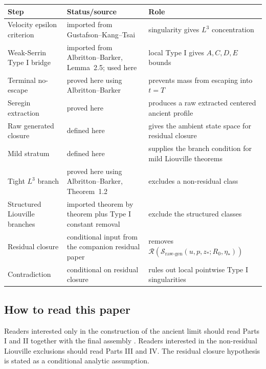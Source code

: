 \documentclass[11pt]{amsart}
\theoremstyle{plain}
\theoremstyle{definition}
\theoremstyle{remark}
\numberwithin{equation}{section}
\newcommand{\calS}{\mathcal S}
\newcommand{\calR}{\mathcal R}
\begin{document}
\begin{center}
\small
\setlength{\tabcolsep}{4pt}
\begin{tabular}{@{}>{\raggedright\arraybackslash}p{}
                >{\raggedright\arraybackslash}p{}
                >{\raggedright\arraybackslash}p{}@{}}
\hline
Step & Status/source & Role \\
\hline
Velocity epsilon criterion & imported from Gustafson--Kang--Tsai & singularity gives \(L^3\) concentration \\
Weak-Serrin Type I bridge & imported from Albritton--Barker, Lemma~2.5; used here & local Type I gives \(A,C,D,E\) bounds \\
Terminal no-escape & proved here using Albritton--Barker & prevents mass from escaping into \(t=T\) \\
Seregin extraction & proved here & produces a raw extracted centered ancient profile \\
Raw generated closure & defined here & gives the ambient state space for residual closure \\
Mild stratum & defined here & supplies the branch condition for mild Liouville theorems \\
Tight \(L^3\) branch & proved here using Albritton--Barker, Theorem~1.2 & excludes a non-residual class \\
Structured Liouville branches & imported theorem by theorem plus Type I constant removal & exclude the structured classes \\
Residual closure & conditional input from the companion residual paper & removes \(\calR(\calS_{\mathrm{raw\text{-}gen}}(u,p,z_*;R_0,\eta_*))\) \\
Contradiction & conditional on residual closure & rules out local pointwise Type I singularities \\
\hline
\end{tabular}
\end{center}

\subsection*{How to read this paper}

Readers interested only in the construction of the ancient limit should read
Parts I and II together with the final assembly
.  Readers interested in the non-residual
Liouville exclusions should read Parts III and IV.  The residual closure
hypothesis  is stated as a conditional analytic
assumption.
\end{document}
